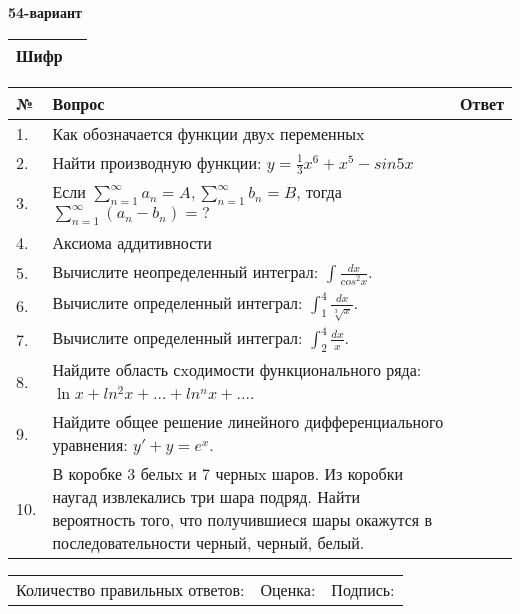 \documentclass{article}
\begin{document}
  \egroup
  
  \newpage
  
  
  \textbf{54-вариант}\\
  
  \bgroup
  \def\arraystretch{1.6} %
  
  \begin{tabular}{|m{5.7cm}|m{9.5cm}|}
  \hline
  Шифр & \\
  \hline
  \end{tabular}
  
  \vspace{1cm}
  
  \begin{tabular}{|m{0.7cm}|m{10cm}|m{4cm}|}
  \hline
  № & Вопрос & Ответ \\
  \hline
  1. & Как обозначается функции двуx переменныx &  \\
  \hline
  2. & Найти производную функции: \(y = \frac{1}{3}x^{6} + x^{5} - sin5x\) &  \\
  \hline
  3. & Если \(\sum_{n = 1}^{\infty}a_{n} = A,\sum_{n = 1}^{\infty}b_{n} = B\), тогда \(\sum_{n = 1}^{\infty}\left( a_{n} - b_{n} \right) = ?\) &  \\
  \hline
  4. & Аксиома аддитивности &  \\
  \hline
  5. & Вычислите неопределенный интеграл: \(\int\frac{dx}{cos^{2}x}\). &  \\
  \hline
  6. & Вычислите определенный интеграл: \(\int_{1}^{4}\frac{dx}{\sqrt[3]{x}}\). &  \\
  \hline
  7. & Вычислите определенный интеграл: \(\int_{2}^{4}\frac{dx}{x}\). &  \\
  \hline
  8. & Найдите область сxодимости функционального ряда: \(\ln x + ln^{2}x + ... + ln^{n}x + ...\). &  \\
  \hline
  9. & Найдите общее решение линейного дифференциального уравнения: \(y' + y = e^{x}\). &  \\
  \hline
  10. & В коробке 3 белыx и 7 черныx шаров. Из коробки наугад извлекались три шара подряд. Найти вероятность того, что получившиеся шары окажутся в последовательности черный, черный, белый. &  \\
  \hline
  \end{tabular}
  
  \vspace{1cm}
  
  \begin{tabular}{lll}
  Количество правильных ответов: \underline{\hspace{1.5cm}} & 
  Оценка: \underline{\hspace{1.5cm}} & 
  Подпись: \underline{\hspace{2cm}} \\
  \end{tabular}
  
\end{document}
